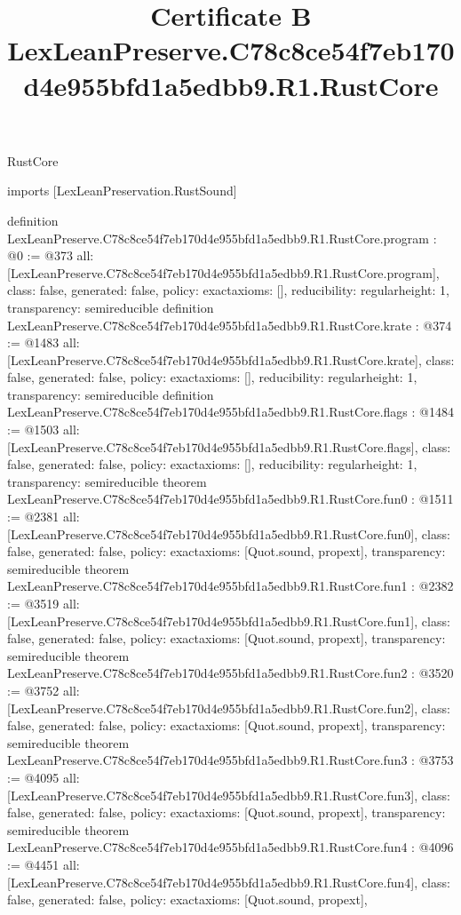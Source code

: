 \begin{lexlean}{RustCore}
\title{Certificate B LexLeanPreserve.C78c8ce54f7eb170d4e955bfd1a5edbb9.R1.RustCore}
\begin{coremodule}
imports [LexLeanPreservation.RustSound]

definition LexLeanPreserve.C78c8ce54f7eb170d4e955bfd1a5edbb9.R1.RustCore.program : @0 := @373 {
  all: [LexLeanPreserve.C78c8ce54f7eb170d4e955bfd1a5edbb9.R1.RustCore.program],
  class: false,
  generated: false,
  policy: exact{axioms: []},
  reducibility: regular{height: 1},
  transparency: semireducible
}
definition LexLeanPreserve.C78c8ce54f7eb170d4e955bfd1a5edbb9.R1.RustCore.krate : @374 := @1483 {
  all: [LexLeanPreserve.C78c8ce54f7eb170d4e955bfd1a5edbb9.R1.RustCore.krate],
  class: false,
  generated: false,
  policy: exact{axioms: []},
  reducibility: regular{height: 1},
  transparency: semireducible
}
definition LexLeanPreserve.C78c8ce54f7eb170d4e955bfd1a5edbb9.R1.RustCore.flags : @1484 := @1503 {
  all: [LexLeanPreserve.C78c8ce54f7eb170d4e955bfd1a5edbb9.R1.RustCore.flags],
  class: false,
  generated: false,
  policy: exact{axioms: []},
  reducibility: regular{height: 1},
  transparency: semireducible
}
theorem LexLeanPreserve.C78c8ce54f7eb170d4e955bfd1a5edbb9.R1.RustCore.fun0 : @1511 := @2381 {
  all: [LexLeanPreserve.C78c8ce54f7eb170d4e955bfd1a5edbb9.R1.RustCore.fun0],
  class: false,
  generated: false,
  policy: exact{axioms: [Quot.sound, propext]},
  transparency: semireducible
}
theorem LexLeanPreserve.C78c8ce54f7eb170d4e955bfd1a5edbb9.R1.RustCore.fun1 : @2382 := @3519 {
  all: [LexLeanPreserve.C78c8ce54f7eb170d4e955bfd1a5edbb9.R1.RustCore.fun1],
  class: false,
  generated: false,
  policy: exact{axioms: [Quot.sound, propext]},
  transparency: semireducible
}
theorem LexLeanPreserve.C78c8ce54f7eb170d4e955bfd1a5edbb9.R1.RustCore.fun2 : @3520 := @3752 {
  all: [LexLeanPreserve.C78c8ce54f7eb170d4e955bfd1a5edbb9.R1.RustCore.fun2],
  class: false,
  generated: false,
  policy: exact{axioms: [Quot.sound, propext]},
  transparency: semireducible
}
theorem LexLeanPreserve.C78c8ce54f7eb170d4e955bfd1a5edbb9.R1.RustCore.fun3 : @3753 := @4095 {
  all: [LexLeanPreserve.C78c8ce54f7eb170d4e955bfd1a5edbb9.R1.RustCore.fun3],
  class: false,
  generated: false,
  policy: exact{axioms: [Quot.sound, propext]},
  transparency: semireducible
}
theorem LexLeanPreserve.C78c8ce54f7eb170d4e955bfd1a5edbb9.R1.RustCore.fun4 : @4096 := @4451 {
  all: [LexLeanPreserve.C78c8ce54f7eb170d4e955bfd1a5edbb9.R1.RustCore.fun4],
  class: false,
  generated: false,
  policy: exact{axioms: [Quot.sound, propext]},
}
\end{coremodule}
\end{lexlean}
